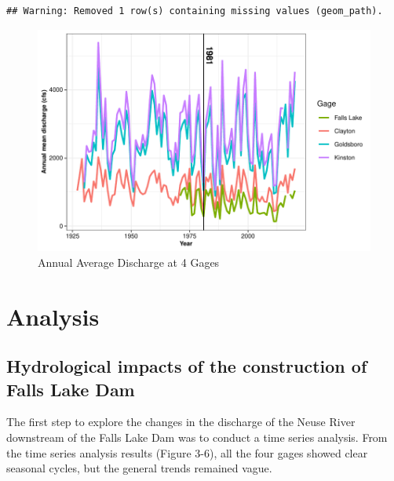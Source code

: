 \documentclass[
  12pt,
]{article}
\begin{document}
\begin{verbatim}
## Warning: Removed 1 row(s) containing missing values (geom_path).
\end{verbatim}

\begin{figure}

\includegraphics{Gardner_Zeng_ENV872_Project_files/figure-latex/Plot annual mean discharge-1} \hfill{}

\caption{Annual Average Discharge at 4 Gages}\label{fig:Plot annual mean discharge}
\end{figure}

\hypertarget{analysis}{%
\section{Analysis}\label{analysis}}

\hypertarget{hydrological-impacts-of-the-construction-of-falls-lake-dam}{%
\subsection{Hydrological impacts of the construction of Falls Lake
Dam}\label{hydrological-impacts-of-the-construction-of-falls-lake-dam}}

The first step to explore the changes in the discharge of the Neuse
River downstream of the Falls Lake Dam was to conduct a time series
analysis. From the time series analysis results (Figure 3-6), all the
four gages showed clear seasonal cycles, but the general trends remained
vague.
\end{document}
